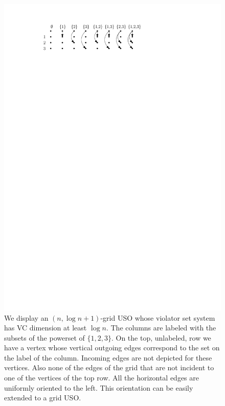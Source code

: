 \documentclass[runningheads,a4paper]{llncs}
\begin{document}
\begin{figure}[h!] 
  	\centering
  	\includegraphics{shatteredgrid.pdf}
  	\caption{\small We display an $(n,\log n + 1)$-grid USO whose violator set system has VC dimension at least $\log n$. 
	  The columns are labeled with the subsets of the powerset of $\{1,2,3\}$. On the top, unlabeled, row we have a vertex whose 
	  vertical outgoing edges correspond to the set on the label of the column. Incoming edges are not depicted for these vertices. Also none 
	  of the edges of the grid that are not incident to one of the vertices of the top row. All the horizontal edges are uniformly oriented to the left.
	  This orientation can be easily extended to a grid USO.} 
  	\label{fig:shatteredgrid}
  \end{figure}
  


\end{document}
